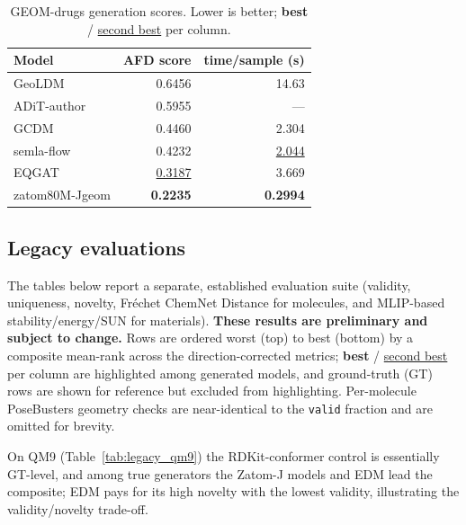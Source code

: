 \documentclass[11pt]{article}
\begin{document}
\begin{table}[H]
\centering
\small
\caption{GEOM-drugs generation scores. Lower is better; \textbf{best} / \underline{second
best} per column.}
\label{tab:eval_geom}
\begin{tabular}{l r r}
\toprule
Model & AFD score & time/sample (s) \\
\midrule
GeoLDM         & 0.6456 & 14.63 \\
ADiT-author    & 0.5955 & --- \\
GCDM           & 0.4460 & 2.304 \\
semla-flow     & 0.4232 & \underline{2.044} \\
EQGAT          & \underline{0.3187} & 3.669 \\
zatom80M-Jgeom & \textbf{0.2235} & \textbf{0.2994} \\
\bottomrule
\end{tabular}
\end{table}

\subsection{Legacy evaluations}

The tables below report a separate, established evaluation suite (validity, uniqueness,
novelty, Fr\'echet ChemNet Distance for molecules, and MLIP-based stability/energy/SUN for
materials). \textbf{These results are preliminary and subject to change.} Rows are ordered
worst (top) to best (bottom) by a composite mean-rank across the direction-corrected metrics;
\textbf{best} / \underline{second best} per column are highlighted among generated models, and
ground-truth (GT) rows are shown for reference but excluded from highlighting. Per-molecule
PoseBusters geometry checks are near-identical to the \texttt{valid} fraction and are omitted
for brevity.

On QM9 (Table~\ref{tab:legacy_qm9}) the RDKit-conformer control is essentially GT-level, and
among true generators the Zatom-J models and EDM lead the composite; EDM pays for its high
novelty with the lowest validity, illustrating the validity/novelty trade-off.
\end{document}
